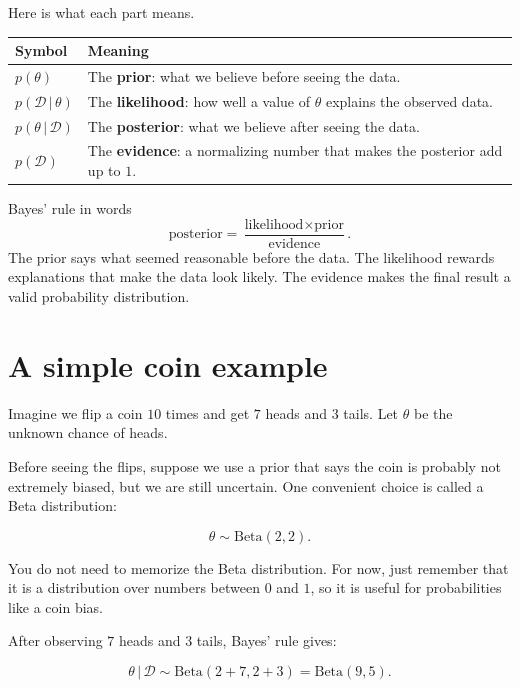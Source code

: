 \documentclass[11pt]{article}
\newcommand{\data}{\mathcal{D}}
\newcommand{\given}{\,|\,}
\begin{document}
Here is what each part means.

\begin{center}
\renewcommand{\arraystretch}{1.25}
\begin{tabular}{>{\raggedright\arraybackslash}p{} >{\raggedright\arraybackslash}p{}}
\toprule
Symbol & Meaning \\
\midrule
$p(\theta)$ & The \textbf{prior}: what we believe before seeing the data. \\
$p(\data \given \theta)$ & The \textbf{likelihood}: how well a value of $\theta$ explains the observed data. \\
$p(\theta \given \data)$ & The \textbf{posterior}: what we believe after seeing the data. \\
$p(\data)$ & The \textbf{evidence}: a normalizing number that makes the posterior add up to $1$. \\
\bottomrule
\end{tabular}
\end{center}

\begin{idea}{Bayes' rule in words}
\[
\text{posterior} = \frac{\text{likelihood} \times \text{prior}}{\text{evidence}}.
\]
The prior says what seemed reasonable before the data. The likelihood rewards explanations that make the data look likely. The evidence makes the final result a valid probability distribution.
\end{idea}

\section{A simple coin example}

Imagine we flip a coin $10$ times and get $7$ heads and $3$ tails.
Let $\theta$ be the unknown chance of heads.

Before seeing the flips, suppose we use a prior that says the coin is probably not extremely biased, but we are still uncertain. One convenient choice is called a Beta distribution:

\[
\theta \sim \mathrm{Beta}(2,2).
\]

You do not need to memorize the Beta distribution. For now, just remember that it is a distribution over numbers between $0$ and $1$, so it is useful for probabilities like a coin bias.

After observing $7$ heads and $3$ tails, Bayes' rule gives:

\[
\theta \given \data \sim \mathrm{Beta}(2+7, 2+3) = \mathrm{Beta}(9,5).
\]
\end{document}
